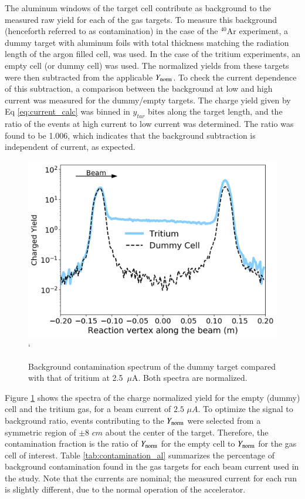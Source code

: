\documentclass[review,numbers,sort&compress]{elsarticle}
\begin{document}
The aluminum windows of the target cell contribute as background to the measured raw yield for each of the gas targets. 
To measure this background (henceforth referred to as contamination) in the case of the $^{40}$Ar experiment, 
a dummy target with aluminum foils with total thickness matching the radiation length of the argon filled cell, 
was used.
In the case of the tritium experiments, an empty cell (or dummy cell)  was used. The normalized yields from 
these targets were then subtracted from the applicable $Y_{\rm{norm}}$. To check the current dependence of 
this subtraction, a comparison between the background at low and high current was measured for the dummy/empty targets. The charge yield given by Eq \ref{eq:current_calc} was binned in $y_{tar}$ bites along the target length, and the ratio of the events at high current to low current was determined. The ratio was found to be 1.006, which indicates that the background subtraction is independent of current, as expected. 

\begin{figure}[h]
 \centering
 \includegraphics[width=\linewidth]{images/contamination.pdf}`
  \caption{Background contamination spectrum of the dummy target compared with that of tritium at 2.5~$\mu$A.  Both spectra are normalized.}
  \label{fig:bk_empty}
\end{figure}

Figure \ref{fig:bk_empty} shows the spectra of the charge normalized yield for the empty (dummy) cell and the tritium gas, for a beam current of $2.5$ $\mu A$. To optimize the signal to background ratio, events contributing to the $Y_{\rm{norm}}$ were selected from a symmetric region of $\pm 8$ $cm$ about the center of the target. Therefore, the contamination fraction is the ratio of $Y_{\rm{norm}}$ for the empty cell to $Y_{\rm{norm}}$ for the gas cell of interest. Table \ref{tab:contamination_al} summarizes the percentage of background contamination found in the gas targets for each beam current used in the study. Note that the currents are nominal; the measured current for each run is slightly different, due to the normal operation of the accelerator.
 
\end{document}
